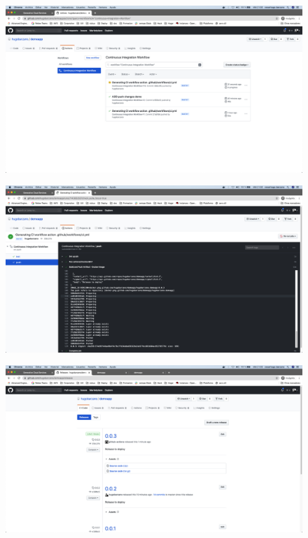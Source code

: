 \documentclass[a4paper,11pt]{book}
\begin{document}
   \begin{figure}[H]
\centering
\includegraphics[scale=0.2]{imagenes/casouso/4_4.png}
\caption{   }
\end{figure}


   \begin{figure}[H]
\centering
\includegraphics[scale=0.2]{imagenes/casouso/4_5.png}
\caption{   }
\end{figure}


   \begin{figure}[H]
\centering
\includegraphics[scale=0.2]{imagenes/casouso/4_6.png}
\caption{   }
\end{figure}
\end{document}
